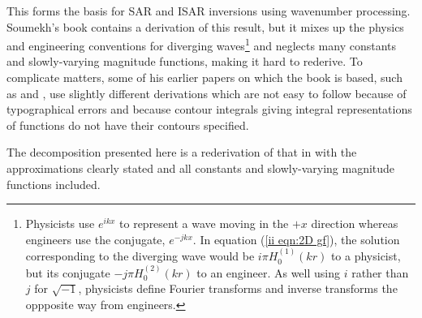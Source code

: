This forms the basis for SAR and ISAR inversions using wavenumber
processing.  Soumekh's book \cite{Sou94} contains a derivation of this
result, but it mixes up the physics and engineering conventions for
diverging waves\footnote{Physicists use $e^{ikx}$ to represent a wave moving
in the $+x$ direction whereas engineers use the conjugate, $e^{-jkx}$.  In
equation (\protect\ref{ii eqn:2D gf}), the solution corresponding to the
diverging wave would be $i\pi H_0^{(1)}(kr)$ to a physicist, but its 
conjugate $-j\pi H^{(2)}_0(kr)$ to an engineer.  As well using $i$ rather
than $j$ for $\sqrt{-1}$, physicists define Fourier transforms and inverse 
transforms the oppposite way from engineers.} and neglects many constants
and slowly-varying magnitude functions, making it hard to rederive.  To
complicate matters, some of his earlier papers on which the book is based,
such as \cite{Sou91} and \cite{Sou92a}, use slightly different derivations
which are not easy to follow because of typographical errors and because 
contour integrals giving integral representations of functions do not have
their contours specified.

The decomposition presented here is a rederivation of that in \cite{Sou94}
with the approximations clearly stated and all constants and slowly-varying
magnitude functions included.

